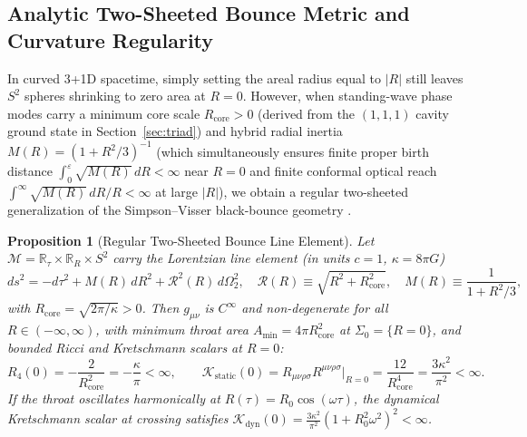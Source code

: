 \documentclass[pdflatex,sn-mathphys-num]{sn-jnl}
\theoremstyle{thmstyleone}
\newtheorem{proposition}[theorem]{Proposition}
\theoremstyle{thmstyletwo}
\theoremstyle{thmstylethree}
\begin{document}
\subsection{Analytic Two-Sheeted Bounce Metric and Curvature Regularity}\label{subsec:regular_metric}

In curved 3+1D spacetime, simply setting the areal radius equal to $|R|$ still leaves $S^2$ spheres shrinking to zero area at $R=0$. However, when standing-wave phase modes carry a minimum core scale $R_{\mathrm{core}} > 0$ (derived from the $(1,1,1)$ cavity ground state in Section~\ref{sec:triad}) and hybrid radial inertia $M(R) = (1 + R^2/3)^{-1}$ (which simultaneously ensures finite proper birth distance $\int_0^\varepsilon \sqrt{M(R)}\,dR < \infty$ near $R=0$ and finite conformal optical reach $\int^\infty \sqrt{M(R)}\,dR/R < \infty$ at large $|R|$), we obtain a regular two-sheeted generalization of the Simpson--Visser black-bounce geometry \cite{SimpsonVisser2019,Bronnikov2007}.

\begin{proposition}[Regular Two-Sheeted Bounce Line Element]\label{prop:bounce}
Let $\mathcal{M} = \mathbb{R}_\tau \times \mathbb{R}_R \times S^2$ carry the Lorentzian line element (in units $c=1$, $\kappa = 8\pi G$)
\begin{equation}\label{eq:bounce_metric}
ds^2 = -d\tau^2 + M(R)\,dR^2 + \mathcal{R}^2(R)\,d\Omega_2^2, \quad \mathcal{R}(R) \equiv \sqrt{R^2 + R_{\mathrm{core}}^2}, \quad M(R) \equiv \frac{1}{1 + R^2/3},
\end{equation}
with $R_{\mathrm{core}} = \sqrt{2\pi/\kappa} > 0$. Then $g_{\mu\nu}$ is $C^\infty$ and non-degenerate for all $R \in (-\infty,\infty)$, with minimum throat area $A_{\min} = 4\pi R_{\mathrm{core}}^2$ at $\Sigma_0 = \{R=0\}$, and bounded Ricci and Kretschmann scalars at $R=0$:
\begin{equation}\label{eq:bounce_invariants}
R_4(0) = -\frac{2}{R_{\mathrm{core}}^2} = -\frac{\kappa}{\pi} < \infty, \qquad \mathcal{K}_{\mathrm{static}}(0) = R_{\mu\nu\rho\sigma}R^{\mu\nu\rho\sigma}\Big|_{R=0} = \frac{12}{R_{\mathrm{core}}^4} = \frac{3\kappa^2}{\pi^2} < \infty.
\end{equation}
If the throat oscillates harmonically at $R(\tau) = R_0\cos(\omega\tau)$, the dynamical Kretschmann scalar at crossing satisfies $\mathcal{K}_{\mathrm{dyn}}(0) = \frac{3\kappa^2}{\pi^2}(1 + R_0^2\omega^2)^2 < \infty$.
\end{proposition}
\end{document}
